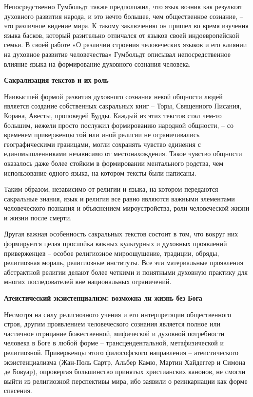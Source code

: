 Непосредственно Гумбольдт также предположил, что язык возник как результат духовного развития народа, и это нечто большее, чем общественное сознание, – это различное видение мира. К такому заключению он пришел во время изучения языка басков, который разительно отличался от языков своей индоевропейской семьи. В своей работе «О различии строения человеческих языков и его влиянии на духовное развитие человечества» Гумбольдт описывал непосредственное влияние языка на формирование духовного сознания человека.

\textbf{Сакрализация текстов и их роль}

Наивысшей формой развития духовного сознания некой общности людей является создание собственных сакральных книг – Торы, Священного Писания, Корана, Авесты, проповедей Будды. Каждый из этих текстов стал чем-то большим, нежели просто послужил формированию народной общности, – со временем приверженцы той или иной религии не ограничивались географическими границами, могли сохранять чувство единения с единомышленниками независимо от местонахождения. Такое чувство общности оказалось даже более стойким в формировании ментального родства, чем использование одного языка, на котором тексты были написаны.

Таким образом, независимо от религии и языка, на котором передаются сакральные знания, язык и религия все равно являются важными элементами человеческого познания и объяснением мироустройства, роли человеческой жизни и жизни после смерти.

Другая важная особенность сакральных текстов состоит в том, что вокруг них формируется целая прослойка важных культурных и духовных проявлений приверженцев – особое религиозное мироощущение, традиции, обряды, религиозная мораль, религиозные институты. Все эти материальные проявления абстрактной религии делают более четкими и понятными духовную практику для многих последователей вне национальных ограничений.

\textbf{Атеистический экзистенциализм: возможна ли жизнь без Бога}

Несмотря на силу религиозного учения и его интерпретации общественного строя, другим проявлением человеческого сознания является полное или частичное отрицание божественной, мифической и духовной потребности человека в Боге в любой форме – трансцендентальной, метафизической и религиозной. Приверженцы этого философского направления – атеистического экзистенциализма (Жан-Поль Сартр, Альбер Камю, Мартин Хайдеггер и Симона де Бовуар), опровергая большинство принятых христианских канонов, не смогли выйти из религиозной перспективы мира, ибо заявили о реинкарнации как форме спасения.

